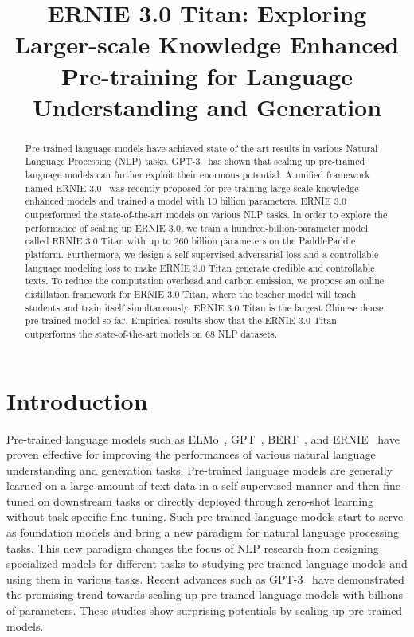 \title{ERNIE 3.0 Titan: Exploring Larger-scale Knowledge Enhanced Pre-training for Language Understanding and Generation}

\begin{abstract}
Pre-trained language models have achieved state-of-the-art results in various Natural Language Processing (NLP) tasks. GPT-3~\cite{gpt-3} has shown that scaling up pre-trained language models can further exploit their enormous potential. A unified framework named ERNIE 3.0~\cite{sun2021ernie} was recently proposed for pre-training large-scale knowledge enhanced models and trained a model with 10 billion parameters. ERNIE 3.0 outperformed the state-of-the-art models on various NLP tasks. In order to explore the performance of scaling up ERNIE 3.0, we train a hundred-billion-parameter model called ERNIE 3.0 Titan with up to 260 billion parameters on the PaddlePaddle~\cite{ma2019paddlepaddle} platform. Furthermore, we design a self-supervised adversarial loss and a controllable language modeling loss to make ERNIE 3.0 Titan generate credible and controllable texts. To reduce the computation overhead and carbon emission, we propose an online distillation framework for ERNIE 3.0 Titan, where the teacher model will teach students and train itself simultaneously. ERNIE 3.0 Titan is the largest Chinese dense pre-trained model so far. Empirical results show that the ERNIE 3.0 Titan outperforms the state-of-the-art models on 68 NLP datasets.
\end{abstract}

\section{Introduction} 
Pre-trained language models such as ELMo~\cite{peters2018deep}, GPT~\cite{radford2018improving}, BERT~\cite{devlin2018bert}, and ERNIE~\cite{sun2019ernie} have proven effective for improving the performances of various natural language understanding and generation tasks. Pre-trained language models are generally learned on a large amount of text data in a self-supervised manner and then fine-tuned on downstream tasks or directly deployed through zero-shot learning without task-specific fine-tuning. Such pre-trained language models start to serve as foundation models and bring a new paradigm for natural language processing tasks. This new paradigm changes the focus of NLP research from designing specialized models for different tasks to studying pre-trained language models and using them in various tasks. Recent advances such as GPT-3~\cite{gpt-3} have demonstrated the promising trend towards scaling up pre-trained language models with billions of parameters. These studies show surprising potentials by scaling up pre-trained models.

